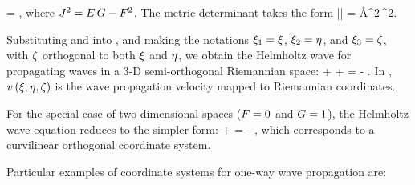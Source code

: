   \left[g^{ij}\right] =
  \;,
\eeq
where $J^2 = E\,G-F^2$. 
The metric determinant takes the form
\beq \label{eqn:det}
  || = \AA^2\,\JJ^2\;.
\eeq
\par
Substituting  and  into
, 
and making the notations
$\xi_1=\xi$, $\xi_2=\eta$, and $\xi_3=\zeta$, 
with $\zeta$ orthogonal to both $\xi$ and $\eta$,
we obtain the Helmholtz wave 
for propagating waves in a {3-D} semi-orthogonal Riemannian space:
\beqa \label{eqn:weqrc.3d}
\lb
\eone{\lp \frac{\JJ}{\AA} \done{\W}{\qz}\rp}{\qz}
+
\eone{\lp 
\GG\frac{\AA}{\JJ} \done{\W}{\qx} -
\FF\frac{\AA}{\JJ} \done{\W}{\qy}
\rp}{\qx}
+
\eone{\lp 
\EE\frac{\AA}{\JJ} \done{\W}{\qy} -
\FF\frac{\AA}{\JJ} \done{\W}{\qx}
\rp}{\qy}
\rb
= -  \W \;.
\eeqa
In , $v \left( \xi,\eta,\zeta \right)$ 
is the wave propagation velocity mapped to Riemannian coordinates.
\par
For the special case of two dimensional spaces
($F=0$ and $G=1$),
the Helmholtz wave equation reduces to the simpler form:
\beq \label{eqn:weqrc.2d}
\lb \eone{\lp \frac{\JJ}{\AA} \done{\W}{\qz} \rp}{\qz} + 
    \eone{\lp \frac{\AA}{\JJ} \done{\W}{\qx} \rp}{\qx} \rb 
= -  \W \;,
\eeq
which corresponds to a curvilinear orthogonal coordinate system.
\par
Particular examples of coordinate systems for one-way wave propagation are:
